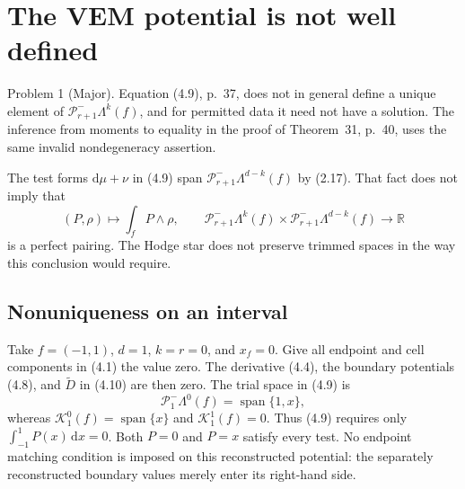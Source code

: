 \documentclass[10pt]{article}
\begin{document}
\section*{The VEM potential is not well defined}
Problem 1 (Major).  Equation (4.9), p. 37, does not in general define a unique element of \(\mathcal P^-_{r+1}\Lambda^k(f)\), and for permitted data it need not have a solution. The inference from moments to equality in the proof of Theorem 31, p. 40, uses the same invalid nondegeneracy assertion.\par
The test forms \(\mathrm d\mu+\nu\) in (4.9) span \(\mathcal P^-_{r+1}\Lambda^{d-k}(f)\) by (2.17). That fact does not imply that \[(P,\rho)\longmapsto\int_f P\wedge\rho,\qquad
 \mathcal P^-_{r+1}\Lambda^k(f)\times
 \mathcal P^-_{r+1}\Lambda^{d-k}(f)\longrightarrow\mathbb R
                                                        \tag{1}\] is a perfect pairing. The Hodge star does not preserve trimmed spaces in the way this conclusion would require.\par
\subsection*{Nonuniqueness on an interval}
Take \(f=(-1,1)\), \(d=1\), \(k=r=0\), and \(x_f=0\). Give all endpoint and cell components in (4.1) the value zero. The derivative (4.4), the boundary potentials (4.8), and \(\widetilde D\) in (4.10) are then zero. The trial space in (4.9) is \[\mathcal P^-_1\Lambda^0(f)=\operatorname{span}\{1,x\},\] whereas \(\mathcal K^0_1(f)=\operatorname{span}\{x\}\) and \(\mathcal K^1_1(f)=0\). Thus (4.9) requires only \(\int_{-1}^{1}P(x)\,\mathrm dx=0\). Both \(P=0\) and \(P=x\) satisfy every test. No endpoint matching condition is imposed on this reconstructed potential: the separately reconstructed boundary values merely enter its right-hand side.\par
\end{document}
